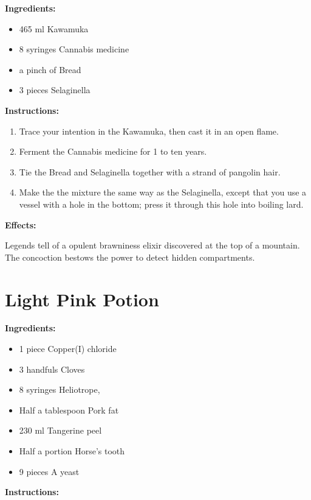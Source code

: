 \documentclass{article}
\begin{document}
\textbf{Ingredients:}

\begin{itemize}
  \item 465 ml Kawamuka
  \item 8 syringes Cannabis medicine
  \item a pinch of Bread
  \item 3 pieces Selaginella
\end{itemize}

\textbf{Instructions:}

\begin{enumerate}
  \item Trace your intention in the Kawamuka, then cast it in an open flame.
  \item Ferment the Cannabis medicine for 1 to ten years.
  \item Tie the Bread and Selaginella together with a strand of pangolin hair.
  \item Make the the mixture the same way as the Selaginella, except that you use a vessel with a hole in the bottom; press it through this hole into boiling lard.
\end{enumerate}

\textbf{Effects:}

Legends tell of a opulent brawniness elixir discovered at the top of a mountain. The concoction bestows the power to detect hidden compartments.

\newpage
\section*{Light Pink Potion}

\textbf{Ingredients:}

\begin{itemize}
  \item 1 piece Copper(I) chloride
  \item 3 handfuls Cloves
  \item 8 syringes Heliotrope,
  \item Half a tablespoon Pork fat
  \item 230 ml Tangerine peel
  \item Half a portion Horse's tooth
  \item 9 pieces A yeast
\end{itemize}

\textbf{Instructions:}
\end{document}
